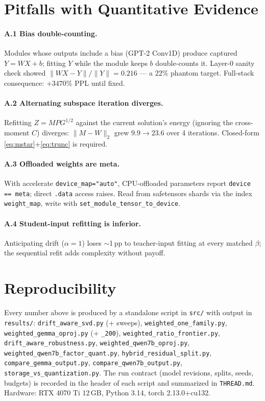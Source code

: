 \documentclass[11pt]{article}
\begin{document}
\appendix

\section{Pitfalls with Quantitative Evidence}\label{app:pitfalls}

\paragraph{A.1 Bias double-counting.} Modules whose outputs include a bias
(GPT-2 Conv1D) produce captured $Y = WX + b$; fitting $Y$ while the module
keeps $b$ double-counts it. Layer-0 sanity check showed
$\|WX - Y\|/\|Y\| = 0.216$ --- a 22\% phantom target. Full-stack
consequence: $+3470\%$ PPL until fixed.

\paragraph{A.2 Alternating subspace iteration diverges.} Refitting
$Z = MPG^{1/2}$ against the current solution's energy (ignoring the
cross-moment $C$) diverges: $\|M-W\|_2$ grew $9.9 \to 23.6$ over 4
iterations. Closed-form \eqref{eq:mstar}+\eqref{eq:trunc} is required.

\paragraph{A.3 Offloaded weights are meta.} With accelerate
\texttt{device\_map="auto"}, CPU-offloaded parameters report
\texttt{device == meta}; direct \texttt{.data} access raises. Read from
safetensors shards via the index \texttt{weight\_map}, write with
\texttt{set\_module\_tensor\_to\_device}.

\paragraph{A.4 Student-input refitting is inferior.} Anticipating drift
($\alpha = 1$) loses $\sim$1\,pp to teacher-input fitting at every matched
$\beta$; the sequential refit adds complexity without payoff.

\section{Reproducibility}

Every number above is produced by a standalone script in \texttt{src/} with
output in \texttt{results/}: \texttt{drift\_aware\_svd.py} (+ sweeps),
\texttt{weighted\_one\_family.py}, \texttt{weighted\_gemma\_oproj.py}
(+ \texttt{\_200}), \texttt{weighted\_ratio\_frontier.py},
\texttt{drift\_aware\_robustness.py}, \texttt{weighted\_qwen7b\_oproj.py},
\texttt{weighted\_qwen7b\_factor\_quant.py},
\texttt{hybrid\_residual\_split.py}, \texttt{compare\_gemma\_output.py},
\texttt{compare\_qwen7b\_output.py},
\texttt{storage\_vs\_quantization.py}. The run contract (model revisions,
splits, seeds, budgets) is recorded in the header of each script and
summarized in \texttt{THREAD.md}. Hardware: RTX 4070 Ti 12\,GB, Python
3.14, torch 2.13.0+cu132.
\end{document}
